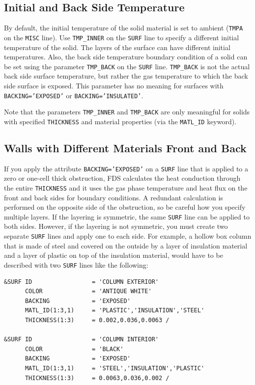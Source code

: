 \documentclass[11pt]{book}
\newcommand{\ct}{\tt\small}
\begin{document}
\subsection{Initial and Back Side Temperature}

\label{info:TMP_INNER}

By default, the initial temperature of the solid material is set to
ambient ({\ct TMPA} on the {\ct MISC} line). Use {\ct TMP\_INNER} on the {\ct SURF} line to
specify a different initial temperature of the solid. The layers of the surface can have different initial temperatures.
Also, the back side temperature boundary condition of a solid can be
set using the parameter {\ct TMP\_BACK} on the {\ct SURF}
line. {\ct TMP\_BACK} is not the actual back side surface temperature,
but rather the gas temperature to which the back side surface is exposed. This
parameter has no meaning for surfaces with {\ct BACKING='EXPOSED'} or
{\ct BACKING='INSULATED'}.

\begin{warning}
\noindent
Note that the parameters {\ct TMP\_INNER} and {\ct TMP\_BACK} are only meaningful for solids with specified {\ct THICKNESS} and material
properties (via the {\ct MATL\_ID} keyword).
\end{warning}



\subsection{Walls with Different Materials Front and Back}
\label{info:EXPOSED}

If you apply the attribute {\ct BACKING='EXPOSED'} on a {\ct SURF} line that is applied to a zero or one-cell thick
obstruction, FDS calculates the heat conduction through the entire {\ct THICKNESS} and it uses the gas phase temperature
and heat flux on the front and back sides for boundary conditions. A redundant calculation is performed on the opposite side of the obstruction, so be
careful how you specify multiple layers. If the layering is symmetric, the same {\ct SURF} line can be applied to both sides. However,
if the layering is not symmetric, you must create two separate {\ct SURF} lines and apply one to each side. For example, a hollow box column that is
made of steel and covered on the outside by a layer of insulation material and a layer of plastic on top of the insulation material,
would have to be described with two {\ct SURF} lines like the following:

\footnotesize
\begin{verbatim}
&SURF ID                 = 'COLUMN EXTERIOR'
      COLOR              = 'ANTIQUE WHITE'
      BACKING            = 'EXPOSED'
      MATL_ID(1:3,1)     = 'PLASTIC','INSULATION','STEEL'
      THICKNESS(1:3)     = 0.002,0.036,0.0063 /

&SURF ID                 = 'COLUMN INTERIOR'
      COLOR              = 'BLACK'
      BACKING            = 'EXPOSED'
      MATL_ID(1:3,1)     = 'STEEL','INSULATION','PLASTIC'
      THICKNESS(1:3)     = 0.0063,0.036,0.002 /
\end{verbatim} \normalsize
\end{document}
